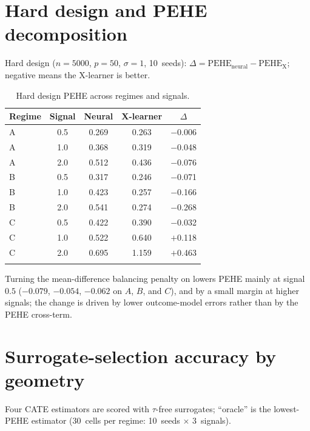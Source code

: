 \documentclass[pdflatex,sn-mathphys-num]{sn-jnl}
\newcommand{\PEHE}{\mathrm{PEHE}}
\begin{document}
\begin{appendices}
\section{Hard design and PEHE decomposition}
\label{app:hard}
Hard design ($n=5000$, $p=50$, $\sigma=1$, 10~seeds): $\Delta=\PEHE_{\mathrm{neural}}-\PEHE_{\mathrm{X}}$; negative means the X-learner is better.

\begin{table}[htbp]
\centering
\caption{Hard design PEHE across regimes and signals.}
\label{tab:hard_design}
\begin{tabular}{@{}lcccc@{}}
\toprule
Regime & Signal & Neural & X-learner & $\Delta$\\
\midrule
A & 0.5 & 0.269 & 0.263 & $-$0.006\\
A & 1.0 & 0.368 & 0.319 & $-$0.048\\
A & 2.0 & 0.512 & 0.436 & $-$0.076\\
B & 0.5 & 0.317 & 0.246 & $-$0.071\\
B & 1.0 & 0.423 & 0.257 & $-$0.166\\
B & 2.0 & 0.541 & 0.274 & $-$0.268\\
C & 0.5 & 0.422 & 0.390 & $-$0.032\\
C & 1.0 & 0.522 & 0.640 & $+$0.118\\
C & 2.0 & 0.695 & 1.159 & $+$0.463\\
\botrule
\end{tabular}
\end{table}

Turning the mean-difference balancing penalty on lowers PEHE mainly at signal~$0.5$ ($-0.079$, $-0.054$, $-0.062$ on $A$, $B$, and $C$), and by a small margin at higher signals; the change is driven by lower outcome-model errors rather than by the PEHE cross-term.

\section{Surrogate-selection accuracy by geometry}
\label{app:surr}
Four CATE estimators are scored with $\tau$-free surrogates; ``oracle'' is the lowest-PEHE estimator (30~cells per regime: 10~seeds $\times$ 3~signals).


\end{appendices}
\end{document}
